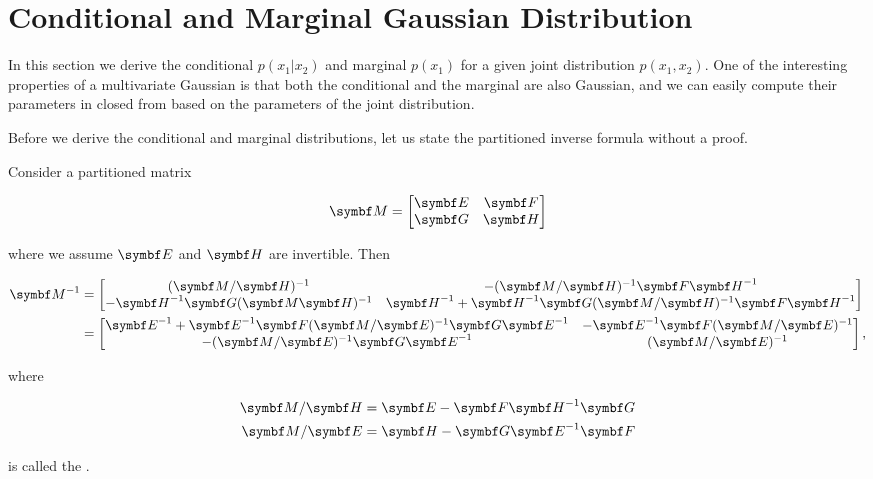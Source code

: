 \section{Conditional and Marginal Gaussian Distribution}

In this section we derive the conditional $p(x_1 | x_2)$ and marginal $p(x_1)$
for a given joint distribution $p(x_1, x_2)$. One of the interesting properties
of a multivariate Gaussian is that both the conditional and the marginal are
also Gaussian, and we can easily compute their parameters in closed from based
on the parameters of the joint distribution.

Before we derive the conditional and marginal distributions, let us state
the partitioned inverse formula without a proof.

\begin{thm} Consider a partitioned matrix

  \begin{equation}
    \mM = \begin{bmatrix} \mE & \mF \\ \mG & \mH \end{bmatrix}
  \end{equation}

  where we assume $\mE$ and $\mH$ are invertible. Then

  \begin{align}
    \mM^{-1} &= \begin{bmatrix}
      (\mM / \mH)^{-1} & -(\mM / \mH)^{-1} \mF \mH^{-1} \\
      -\mH^{-1} \mG (\mM \mH)^{-1} & \mH^{-1} + \mH^{-1} \mG (\mM / \mH)^{-1} \mF \mH^{-1}
    \end{bmatrix} \\
             &= \begin{bmatrix}
      \mE^{-1} + \mE^{-1} \mF (\mM / \mE)^{-1} \mG \mE^{-1} & - \mE^{-1} \mF (\mM / \mE)^{-1} \\
      -(\mM / \mE)^{-1} \mG \mE^{-1} & (\mM / \mE)^{-1}
    \end{bmatrix},
    \label{eq:matrix-inversion-lemma}
  \end{align}

  where

  \begin{align}
    \mM / \mH &= \mE - \mF \mH^{-1} \mG \\
    \mM / \mE &= \mH - \mG \mE^{-1} \mF
  \end{align}

  is called the .
\end{thm}

